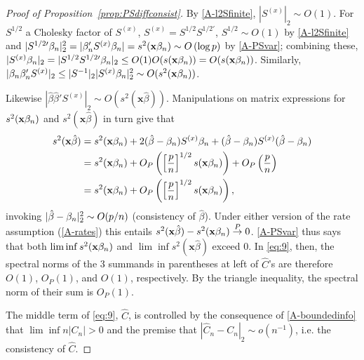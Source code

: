\documentclass{article}
\theoremstyle{remark}
\begin{document}
\begin{proof}[Proof of Proposition~\ref{prop:PSdiffconsist}]
By \ref{A-l2Sfinite}, $|S^{(x)}|_{2} \sim O(1)$.  For $S^{1/2}$ a Cholesky factor of $S^{(x)}$, $S^{(x)} = S^{1/2}S^{1/2\prime}$, $S^{1/2} \sim O(1)$ by \ref{A-l2Sfinite} and $|S^{{1/2}\prime}\beta_{n } |_{2}^{2} = |\beta_{n }'S^{(x)}\beta_{n }| = s^{2}(\mathbf{x}\beta_{n }) \sim O\left( \log p\right)
$ by \ref{A-PSvar}; combining these, $|S^{(x)}\betatrue|_{2} = |S^{1/2}S^{{1/2}\prime}\betatrue|_{2} \leq O(1) O(s(\mathbf{x}\betatrue)) = O(s(\mathbf{x}\betatrue))  %
$.  Similarly, $|\beta_{n }\beta_{n }'S^{(x)}|_{2}  \leq |S^{-1}|_{2} |S^{(x)}\beta_{n }|_{2}^{2} \sim O(s^{2}(\mathbf{x}\beta_{n }))$. 

Likewise $|\hat{\beta}\hat{\beta}'S^{(x)}|_{2} \sim O(s^{2}(\mathbf{x}\hat\beta))$.  Manipulations on matrix expressions for $s^2(\mathbf{x}\beta_{n })$ and $s^2(\mathbf{x}\hat\beta)$ in turn give that 
\begin{align}
  s^{2}(\mathbf{x}\hat\beta) &= s^{2}(\mathbf{x}\beta_{n }) + 2(\hat\beta - \beta_{n })S^{(x)}\beta_{n } + (\hat\beta - \beta_{n })S^{(x)}(\hat\beta -\beta_{n }) \nonumber \\
  &= s^{2}(\mathbf{x}\beta_{n }) + O_{P}\left(\left[\frac{p }{n}\right]^{1/2}s(\mathbf{x}\beta_{n })\right) + O_{P}\left(  \frac{p}{n} \right) \nonumber \\
& = s^{2}(\mathbf{x}\beta_{n }) + O_{P}\left(\left[\frac{p}{n}\right]^{1/2}s(\mathbf{x}\beta_{n })\right)  ,\label{eq:11}
\end{align}
invoking  $|\hat\beta - \beta_{n }|_{2}^{2} \sim O(p/n)$ (consistency of $\hat\beta$).
Under either version of the rate assumption (\ref{A-rates}) this entails $ s^{2}(\mathbf{x}\hat\beta) -  s^{2}(\mathbf{x}\beta_{n }) \stackrel{P}{\rightarrow} 0$.  \ref{A-PSvar} thus says that both  $\lim\inf s^{2}(\mathbf{x}\beta_{n })$ and $\lim\inf s^{2}(\mathbf{x}\hat\beta)$ exceed 0. 
In \eqref{eq:9}, then, the spectral norms of the 3 summands in parentheses at left of $\hat{C}$'s are therefore $O(1)$, $O_{P}(1)$, and $O(1)$, respectively. By the triangle inequality, the spectral norm of their sum is $O_{P}(1)$.

The middle term of \eqref{eq:9}, $\hat C$, is controlled by the consequence of \ref{A-boundedinfo} that $\lim\inf n|C_{n}|>0$ and the premise that $|\hat{C}_{n} - C_{n}|_{2} \sim o(n^{-1})$, i.e. the consistency of $\hat{C}$.  


\end{proof}
\end{document}
